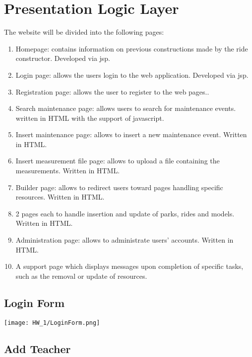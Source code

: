 \section{Presentation Logic Layer}
\graphicspath{ {./HW_1/images/} }

The website will be divided into the following pages:
\begin{enumerate}
    \item Homepage: contains information on previous constructions made by the ride constructor. Developed via
jsp.
    \item Login page: allows the users login to the web application. Developed via jsp.
    \item Registration page: allows the user to register to the web pages..
    \item Search maintenance page: allows users to search for maintenance events. written in HTML with the
support of javascript.
    \item Insert maintenance page: allows to insert a new maintenance event. Written in HTML.
    \item Insert measurement file page: allows to upload a file containing the measurements. Written in HTML.
    \item Builder page: allows to redirect users toward pages handling specific resources. Written in HTML.
    \item 2 pages each to handle insertion and update of parks, rides and models. Written in HTML.
    \item Administration page: allows to administrate users’ accounts. Written in HTML.
    \item A support page which displays messages upon completion of specific tasks, such as the removal or update
of resources.
\end{enumerate}

\subsection{Login Form}


\texttt{[image: HW\_1/LoginForm.png]}

\subsection{Add Teacher}

